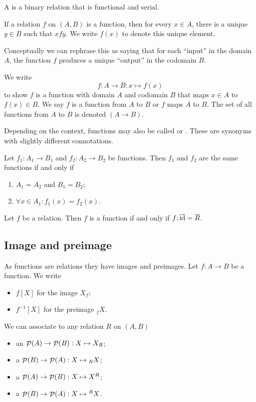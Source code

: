 \begin{definition}
A  is a binary relation that is functional and serial.
\end{definition}
If a relation $f$ on $(A, B)$ is a function, then for every $x\in A$, there is a unique $y\in B$ such that $xfy$. We write $f(x)$ to denote this unique element.

Conceptually we can rephrase this as saying that for each ``input'' in the domain $A$, the function $f$ produces a unique ``output'' in the codomain $B$.

\begin{note}
We write
\[f:A \to B: x\mapsto f(x) \]
to show $f$ is a function with domain $A$ and codomain $B$ that maps $x\in A$ to $f(x)\in B$. We say $f$ is a function from $A$ to $B$ or $f$ maps $A$ to $B$. The set of all functions from $A$ to $B$ is denoted $(A\to B)$.
\end{note}

Depending on the context, functions may also be called  or . These are synonyms with slightly different connotations.

\begin{lemma}
Let $f_1: A_1\to B_1$ and $f_2: A_2\to B_2$ be functions. Then $f_1$ and $f_2$ are the same functions \textup{if and only if}
\begin{enumerate}
\item $A_1 = A_2$ and $B_1 = B_2$;
\item $\forall x\in A_1: f_1(x) = f_2(x)$.
\end{enumerate}
\end{lemma}

\begin{lemma}
Let $f$ be a relation. Then $f$ is a function \textup{if and only if} $f;\overline{\operatorname{id}} = \overline{R}$.
\end{lemma}

\subsection{Image and preimage}
As functions are relations they have images and preimages. Let $f:A\to B$ be a function. We write
\begin{itemize}
\item $f[X]$ for the image $X_f$;
\item $f^{-1}[X]$ for the preimage $_fX$.
\end{itemize}

We can associate to any relation $R$ on $(A,B)$
\begin{itemize}
\item an  $\mathop{\mathcal{P}}(A) \to \mathop{\mathcal{P}}(B): X \mapsto X_R$;
\item a  $\mathop{\mathcal{P}}(B) \to \mathop{\mathcal{P}}(A): X \mapsto {_RX}$;
\item a  $\mathop{\mathcal{P}}(A) \to \mathop{\mathcal{P}}(B): X \mapsto X^R$;
\item a  $\mathop{\mathcal{P}}(B) \to \mathop{\mathcal{P}}(A): X \mapsto {^RX}$.
\end{itemize}

